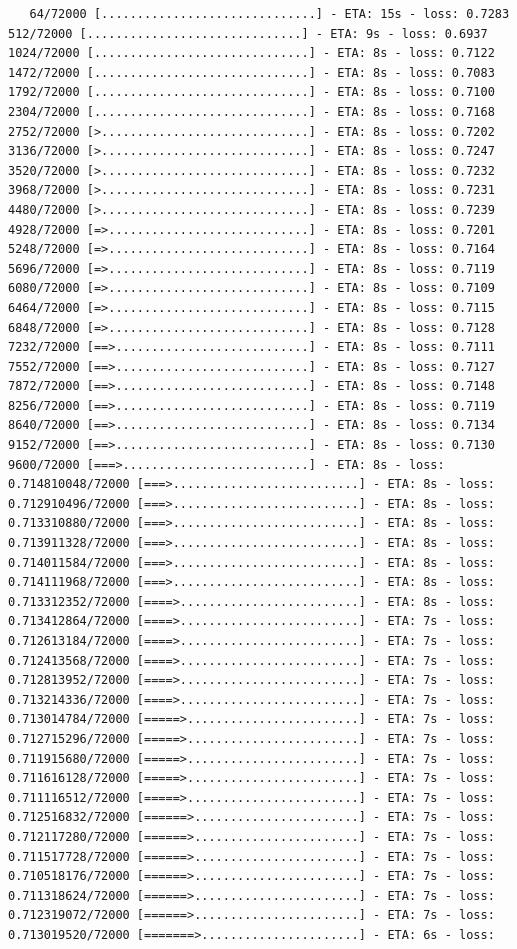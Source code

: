 \documentclass[12pt,fleqn]{article}\usepackage{../../common}
\begin{document}
\begin{verbatim}
   64/72000 [..............................] - ETA: 15s - loss: 0.7283  512/72000 [..............................] - ETA: 9s - loss: 0.6937  1024/72000 [..............................] - ETA: 8s - loss: 0.7122 1472/72000 [..............................] - ETA: 8s - loss: 0.7083 1792/72000 [..............................] - ETA: 8s - loss: 0.7100 2304/72000 [..............................] - ETA: 8s - loss: 0.7168 2752/72000 [>.............................] - ETA: 8s - loss: 0.7202 3136/72000 [>.............................] - ETA: 8s - loss: 0.7247 3520/72000 [>.............................] - ETA: 8s - loss: 0.7232 3968/72000 [>.............................] - ETA: 8s - loss: 0.7231 4480/72000 [>.............................] - ETA: 8s - loss: 0.7239 4928/72000 [=>............................] - ETA: 8s - loss: 0.7201 5248/72000 [=>............................] - ETA: 8s - loss: 0.7164 5696/72000 [=>............................] - ETA: 8s - loss: 0.7119 6080/72000 [=>............................] - ETA: 8s - loss: 0.7109 6464/72000 [=>............................] - ETA: 8s - loss: 0.7115 6848/72000 [=>............................] - ETA: 8s - loss: 0.7128 7232/72000 [==>...........................] - ETA: 8s - loss: 0.7111 7552/72000 [==>...........................] - ETA: 8s - loss: 0.7127 7872/72000 [==>...........................] - ETA: 8s - loss: 0.7148 8256/72000 [==>...........................] - ETA: 8s - loss: 0.7119 8640/72000 [==>...........................] - ETA: 8s - loss: 0.7134 9152/72000 [==>...........................] - ETA: 8s - loss: 0.7130 9600/72000 [===>..........................] - ETA: 8s - loss: 0.714810048/72000 [===>..........................] - ETA: 8s - loss: 0.712910496/72000 [===>..........................] - ETA: 8s - loss: 0.713310880/72000 [===>..........................] - ETA: 8s - loss: 0.713911328/72000 [===>..........................] - ETA: 8s - loss: 0.714011584/72000 [===>..........................] - ETA: 8s - loss: 0.714111968/72000 [===>..........................] - ETA: 8s - loss: 0.713312352/72000 [====>.........................] - ETA: 8s - loss: 0.713412864/72000 [====>.........................] - ETA: 7s - loss: 0.712613184/72000 [====>.........................] - ETA: 7s - loss: 0.712413568/72000 [====>.........................] - ETA: 7s - loss: 0.712813952/72000 [====>.........................] - ETA: 7s - loss: 0.713214336/72000 [====>.........................] - ETA: 7s - loss: 0.713014784/72000 [=====>........................] - ETA: 7s - loss: 0.712715296/72000 [=====>........................] - ETA: 7s - loss: 0.711915680/72000 [=====>........................] - ETA: 7s - loss: 0.711616128/72000 [=====>........................] - ETA: 7s - loss: 0.711116512/72000 [=====>........................] - ETA: 7s - loss: 0.712516832/72000 [======>.......................] - ETA: 7s - loss: 0.712117280/72000 [======>.......................] - ETA: 7s - loss: 0.711517728/72000 [======>.......................] - ETA: 7s - loss: 0.710518176/72000 [======>.......................] - ETA: 7s - loss: 0.711318624/72000 [======>.......................] - ETA: 7s - loss: 0.712319072/72000 [======>.......................] - ETA: 7s - loss: 0.713019520/72000 [=======>......................] - ETA: 6s - loss: 
\end{verbatim}
\end{document}
